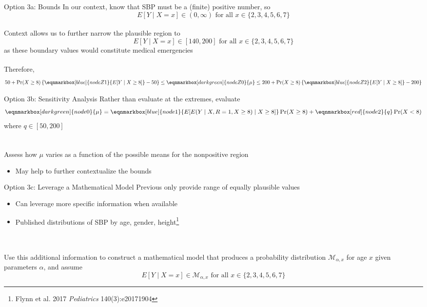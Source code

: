 \documentclass[aspectratio=169]{beamer}
\begin{document}
\begin{frame}{Option 3a: Bounds}
	In our context, know that SBP must be a (finite) positive number, so
	$$ E[Y \mid X=x] \in (0, \infty) \text{ for all } x \in \{2, 3, 4, 5, 6, 7\}$$
	~\\
	Context allows us to further narrow the plausible region to
	$$ E[Y \mid X=x] \in [140, 200] \text{ for all } x \in \{2, 3, 4, 5, 6, 7\}$$
	as these boundary values would constitute medical emergencies
	~\\~\\
	Therefore, 
	$$ 50 + \Pr(X \ge 8)\left\{\eqnmarkbox[blue]{nodeZ1}{E[Y \mid X \ge 8]} - 50\right\} \le \eqnmarkbox[darkgreen]{nodeZ0}{\mu} \le 200 + \Pr(X \ge 8)\left\{\eqnmarkbox[blue]{nodeZ2}{E[Y \mid X \ge 8]} - 200\right\}$$ 
\end{frame}

\begin{frame}{Option 3b: Sensitivity Analysis}
	Rather than evaluate at the extremes, evaluate
	\begin{equation*}
		\eqnmarkbox[darkgreen]{node0}{\mu} = \eqnmarkbox[blue]{node1}{E[E(Y \mid X, R=1, X \ge 8) \mid X \ge 8]} \Pr(X \ge 8) + \eqnmarkbox[red]{node2}{q} \Pr(X < 8)
	\end{equation*}
	where $q \in [50, 200]$
	~\\~\\~\\
	Assess how $\mu$ varies as a function of the possible means for the nonpositive region 
	\begin{itemize}
		\item May help to further contextualize the bounds
	\end{itemize}
\end{frame}

\begin{frame}{Option 3c: Leverage a Mathematical Model}
	Previous only provide range of equally plausible values
	\begin{itemize}
		\item Can leverage more specific information when available
		\item Published distributions of SBP by age, gender, height\footnote[frame]{Flynn et al. 2017 \textit{Pediatrics} 140(3):e20171904}
	\end{itemize}
	~\\~\\
	Use this additional information to construct a mathematical model that produces a probability distribution $\mathcal{M}_{\alpha,x}$ for age $x$ given parameters $\alpha$, and assume
	$$ E[Y \mid X=x] \in \mathcal{M}_{\alpha,x} \text{ for all } x \in \{2, 3, 4, 5, 6, 7\}$$
\end{frame}
\end{document}
